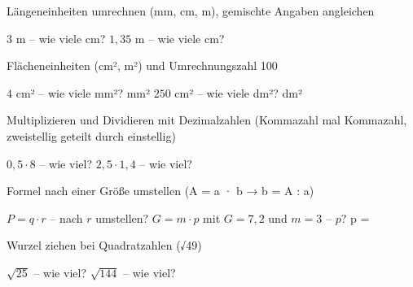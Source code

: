 \setcounter{aufgabe}{0}

\begin{aufgabe}{Längeneinheiten umrechnen (mm, cm, m), gemischte Angaben angleichen}
\begin{teile}
\teil $3$ m – wie viele cm? \leerfeld[cm]
\teil $1{,}35$ m – wie viele cm? \leerfeld[cm]
\end{teile}
\end{aufgabe}

\begin{aufgabe}{Flächeneinheiten (cm², m²) und Umrechnungszahl 100}
\begin{teile}
\teil $4$ cm² – wie viele mm²? \leerfeld mm²
\teil $250$ cm² – wie viele dm²? \leerfeld dm²
\end{teile}
\end{aufgabe}

\begin{aufgabe}{Multiplizieren und Dividieren mit Dezimalzahlen (Kommazahl mal Kommazahl, zweistellig geteilt durch einstellig)}
\begin{teile}
\teil $0{,}5 \cdot 8$ – wie viel? \leerfeld
\teil $2{,}5 \cdot 1{,}4$ – wie viel? \leerfeld
\end{teile}
\end{aufgabe}

\begin{aufgabe}{Formel nach einer Größe umstellen (A = a · b → b = A : a)}
\begin{teile}
\teil $P = q \cdot r$ – nach $r$ umstellen?
\teil $G = m \cdot p$ mit $G = 7{,}2$ und $m = 3$ – $p$? p = \leerfeld
\end{teile}
\end{aufgabe}

\begin{aufgabe}{Wurzel ziehen bei Quadratzahlen (√49)}
\begin{teile}
\teil $\sqrt{25}$ – wie viel? \leerfeld
\teil $\sqrt{144}$ – wie viel? \leerfeld
\end{teile}
\end{aufgabe}

